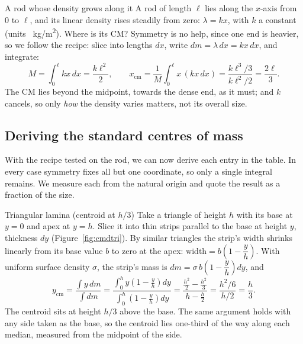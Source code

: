 \begin{exbox}{A rod whose density grows along it}\label{ex:nonuniformrod}
A rod of length $\ell$ lies along the $x$-axis from $0$ to $\ell$, and its linear density rises steadily from
zero: $\lambda=kx$, with $k$ a constant (units \SI{}{kg/m^2}). Where is its CM? Symmetry is no help, since one
end is heavier, so we follow the recipe: slice into lengths $dx$, write $dm=\lambda\,dx=kx\,dx$, and integrate:
\[
M=\int_0^\ell kx\,dx=\frac{k\ell^2}{2},\qquad
x_{\text{cm}}=\frac{1}{M}\int_0^\ell x\,(kx\,dx)=\frac{k\ell^3/3}{k\ell^2/2}=\frac{2\ell}{3}.
\]
The CM lies beyond the midpoint, towards the dense end, as it must; and $k$ cancels, so only \emph{how}
the density varies matters, not its overall size. 
\end{exbox}

\subsection{Deriving the standard centres of mass}

With the recipe tested on the rod, we can now derive each entry in the table. In every case symmetry fixes
all but one coordinate, so only a single integral remains. We measure each from the natural origin and quote the
result as a fraction of the size.

\begin{derivbox}{Triangular lamina (centroid at $h/3$)}
Take a triangle of height $h$ with its base at $y=0$ and apex at $y=h$. Slice it into thin strips
parallel to the base at height $y$, thickness $dy$ (Figure~\ref{fig:cmdtri}). By similar triangles the strip's width shrinks
linearly from its base value $b$ to zero at the apex: $\text{width}=b\left(1-\dfrac{y}{h}\right)$. With
uniform surface density $\sigma$, the strip's mass is $dm=\sigma\,b\left(1-\dfrac{y}{h}\right)dy$, and
\[
y_{\text{cm}}=\frac{\int y\,dm}{\int dm}
=\frac{\displaystyle\int_0^h y\left(1-\tfrac{y}{h}\right)dy}{\displaystyle\int_0^h\left(1-\tfrac{y}{h}\right)dy}
=\frac{\tfrac{h^2}{2}-\tfrac{h^2}{3}}{h-\tfrac{h}{2}}=\frac{h^2/6}{h/2}=\frac{h}{3}.
\]
The centroid sits at height $h/3$ above the base. The same argument holds with any side taken as the
base, so the centroid lies one-third of the way along each median, measured from the midpoint of the
side.
\end{derivbox}

\begin{figure}[htbp]
\centering
{}
\end{figure}

